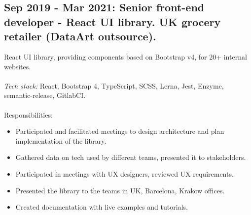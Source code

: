 \documentclass[a4paper, 14pt]{article}
\begin{document}
  \subsection{Sep 2019 - Mar 2021: Senior front-end developer - React UI library. UK grocery retailer (DataArt outsource).}

  React UI library, providing components based on Bootstrap v4, for 20+ internal websites. \\
  \\
    \textit{Tech stack:} React, Bootstrap 4, TypeScript, SCSS, Lerna, Jest, Enzyme, semantic-release, GitlabCI. \\
  \\
  Responsibilities:
    \begin{itemize}
      \item Participated and facilitated meetings to design architecture and plan implementation of the library. \\
      \item Gathered data on tech used by different teams, presented it to stakeholders. \\
      \item Participated in meetings with UX designers, reviewed UX requirements. \\
      \item Presented the library to the teams in UK, Barcelona, Krakow offices. \\
      \item Created documentation with live examples and tutorials. \\
    \end{itemize}
\end{document}
